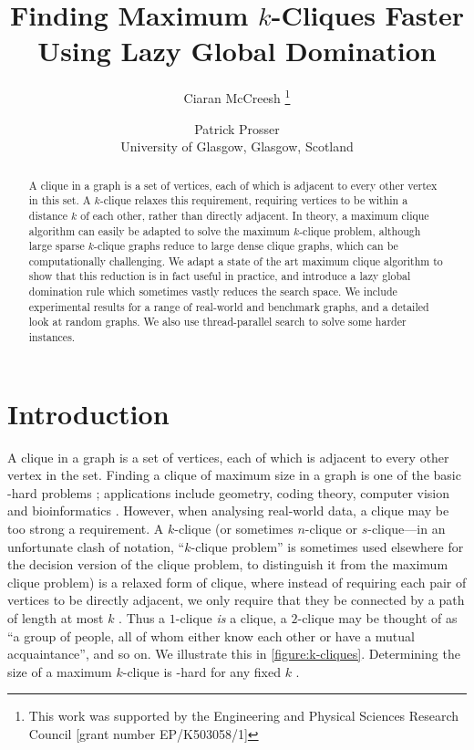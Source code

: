 \documentclass[letterpaper]{article}
\begin{document}
\title{Finding Maximum $k$-Cliques Faster Using Lazy Global Domination}
 \author{
    Ciaran McCreesh%
    \thanks{This work was supported by the Engineering and Physical Sciences Research Council [grant number EP/K503058/1]}
    \and
    Patrick Prosser
    \\ University of Glasgow, Glasgow, Scotland
}
\maketitle

\begin{abstract}
    A clique in a graph is a set of vertices, each of which is adjacent to every other vertex in
    this set. A $k$-clique relaxes this requirement, requiring vertices to be within a distance $k$
    of each other, rather than directly adjacent. In theory, a maximum clique algorithm can easily
    be adapted to solve the maximum $k$-clique problem, although large sparse $k$-clique graphs
    reduce to large dense clique graphs, which can be computationally challenging. We adapt a state of
    the art maximum clique algorithm to show that this reduction is in fact useful in practice, and
    introduce a lazy global domination rule which sometimes vastly reduces the search space. We
    include experimental results for a range of real-world and benchmark graphs, and a detailed look
    at random graphs. We also use thread-parallel search to solve some harder instances.
\end{abstract}

\section{Introduction}

A clique in a graph is a set of vertices, each of which is adjacent to every other vertex in the
set. Finding a clique of maximum size in a graph is one of the basic \NP-hard problems
\cite{Garey:1990}; applications include geometry, coding theory, computer vision and bioinformatics
\cite{Bomze:1999,Butenko:2006}. However, when analysing real-world data, a clique may be too strong
a requirement. A $k$-clique (or sometimes $n$-clique or $s$-clique---in an unfortunate clash of
notation, ``$k$-clique problem'' is sometimes used elsewhere for the decision version of the clique
problem, to distinguish it from the maximum clique problem) is a relaxed form of clique, where
instead of requiring each pair of vertices to be directly adjacent, we only require that they be
connected by a path of length at most $k$ \cite{Luce:1950}.  Thus a $1$-clique \emph{is} a clique, a
$2$-clique may be thought of as ``a group of people, all of whom either know each other or have a
mutual acquaintance'', and so on. We illustrate this in \cref{figure:k-cliques}.  Determining the
size of a maximum $k$-clique is \NP-hard for any fixed $k$ \cite{Bourjolly:2002}.
\end{document}
